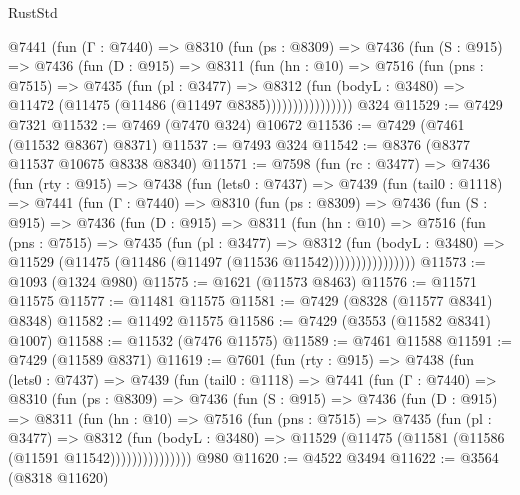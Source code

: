 \begin{lexlean}{RustStd}
\begin{coremodule}
            @7441
              (fun (Γ : @7440) =>
              @8310
                (fun (ps : @8309) =>
                @7436
                  (fun (S : @915) =>
                  @7436
                    (fun (D : @915) =>
                    @8311
                      (fun (hn : @10) =>
                      @7516
                        (fun (pns : @7515) =>
                        @7435
                          (fun (pl : @3477) =>
                          @8312
                            (fun (bodyL : @3480) =>
                            @11472 (@11475 (@11486 (@11497 @8385))))))))))))))))
    @324
@11529 := @7429 @7321
@11532 := @7469 (@7470 @324) @10672
@11536 := @7429 (@7461 (@11532 @8367) @8371)
@11537 := @7493 @324
@11542 := @8376 (@8377 @11537 @10675 @8338 @8340)
@11571 := @7598
    (fun (rc : @3477) =>
    @7436
      (fun (rty : @915) =>
      @7438
        (fun (lets0 : @7437) =>
        @7439
          (fun (tail0 : @1118) =>
          @7441
            (fun (Γ : @7440) =>
            @8310
              (fun (ps : @8309) =>
              @7436
                (fun (S : @915) =>
                @7436
                  (fun (D : @915) =>
                  @8311
                    (fun (hn : @10) =>
                    @7516
                      (fun (pns : @7515) =>
                      @7435
                        (fun (pl : @3477) =>
                        @8312
                          (fun (bodyL : @3480) =>
                          @11529 (@11475 (@11486 (@11497 (@11536 @11542))))))))))))))))
@11573 := @1093 (@1324 @980)
@11575 := @1621 (@11573 @8463)
@11576 := @11571 @11575
@11577 := @11481 @11575
@11581 := @7429 (@8328 (@11577 @8341) @8348)
@11582 := @11492 @11575
@11586 := @7429 (@3553 (@11582 @8341) @1007)
@11588 := @11532 (@7476 @11575)
@11589 := @7461 @11588
@11591 := @7429 (@11589 @8371)
@11619 := @7601
    (fun (rty : @915) =>
    @7438
      (fun (lets0 : @7437) =>
      @7439
        (fun (tail0 : @1118) =>
        @7441
          (fun (Γ : @7440) =>
          @8310
            (fun (ps : @8309) =>
            @7436
              (fun (S : @915) =>
              @7436
                (fun (D : @915) =>
                @8311
                  (fun (hn : @10) =>
                  @7516
                    (fun (pns : @7515) =>
                    @7435
                      (fun (pl : @3477) =>
                      @8312
                        (fun (bodyL : @3480) =>
                        @11529 (@11475 (@11581 (@11586 (@11591 @11542)))))))))))))))
    @980
@11620 := @4522 @3494
@11622 := @3564 (@8318 @11620)

\end{coremodule}
\end{lexlean}
